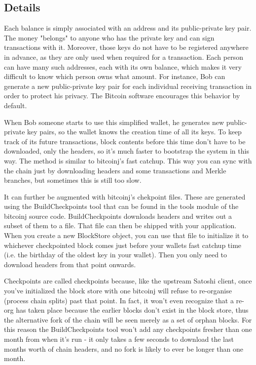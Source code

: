 \documentclass[a4paper,12pt]{article}
\begin{document}
\subsection{Details}
Each balance is simply associated with an address and its public-private key pair. The money "belongs" to anyone who has the private key and can sign transactions with it. Moreover, those keys do not have to be registered anywhere in advance, as they are only used when required for a transaction. Each person can have many such addresses, each with its own balance, which makes it very difficult to know which person owns what amount. For instance, Bob can generate a new public-private key pair for each individual receiving transaction in order to protect his privacy. The Bitcoin software encourages this behavior by default.

When Bob someone starts to use this simplified wallet, he generates new public-private key pairs, so the wallet knows the creation time of all its keys. To keep track of its future transactions, block contents before this time don't have to be downloaded, only the headers, so it's much faster to bootstrap the system in this way. The method is similar to bitcoinj's fast catchup. This way you can sync with the chain just by downloading headers and some transactions and Merkle branches, but sometimes this is still too slow. 

It can further be augmented with bitcoinj's chekpoint files. These are generated using the BuildCheckpoints tool that can be found in the tools module of the bitcoinj source code. BuildCheckpoints downloads headers and writes out a subset of them to a file. That file can then be shipped with your application. When you create a new BlockStore object, you can use that file to initialize it to whichever checkpointed block comes just before your wallets fast catchup time (i.e. the birthday of the oldest key in your wallet). Then you only need to download headers from that point onwards.

Checkpoints are called checkpoints because, like the upstream Satoshi client, once you've initialized the block store with one bitcoinj will refuse to re-organise (process chain splits) past that point. In fact, it won't even recognize that a re-org has taken place because the earlier blocks don't exist in the block store, thus the alternative fork of the chain will be seen merely as a set of orphan blocks. For this reason the BuildCheckpoints tool won't add any checkpoints fresher than one month from when it's run - it only takes a few seconds to download the last months worth of chain headers, and no fork is likely to ever be longer than one month.
\end{document}
